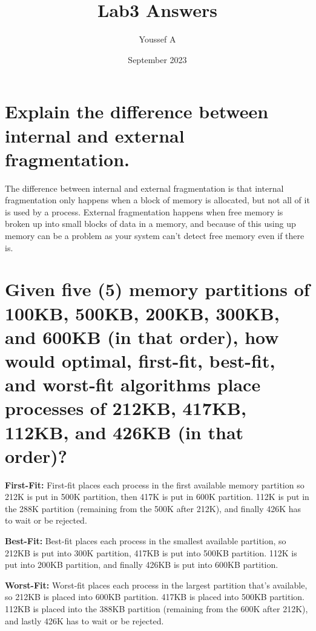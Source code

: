 \documentclass{article}
\title{Lab3 Answers}
\author{Youssef A}
\date{September 2023}
\begin{document}
\maketitle

\section{Explain the difference between internal and external fragmentation.}
The difference between internal and external fragmentation is that internal fragmentation only happens when a block of memory is allocated, but not all of it is used by a process.
External fragmentation happens when free memory is broken up into small blocks of data in a memory,  and because of this using up memory can be a problem as your system can't detect free memory even if there is. 

\section{Given five (5) memory partitions of 100KB, 500KB, 200KB, 300KB, and 600KB (in that order), how would optimal, first-fit, best-fit, and worst-fit algorithms place processes of 212KB, 417KB, 112KB, and 426KB (in that order)?}

\textbf{First-Fit:} First-fit places each process in the first available memory partition so 212K is put in 500K partition, then 417K is put in 600K partition. 112K is put in the 288K partition (remaining from the 500K after 212K), and finally 426K has to wait or be rejected.

\textbf{Best-Fit:} Best-fit places each process in the smallest available partition, so 212KB is put into 300K partition, 417KB is put into 500KB partition. 112K is put into 200KB partition, and finally 426KB is put into 600KB partition. 

\textbf{Worst-Fit:} Worst-fit places each process in the largest partition that's available, so 212KB is placed into 600KB partition. 417KB is placed into 500KB partition. 112KB is placed into the 388KB partition (remaining from the 600K after 212K), and lastly 426K has to wait or be rejected. 

\end{document}
